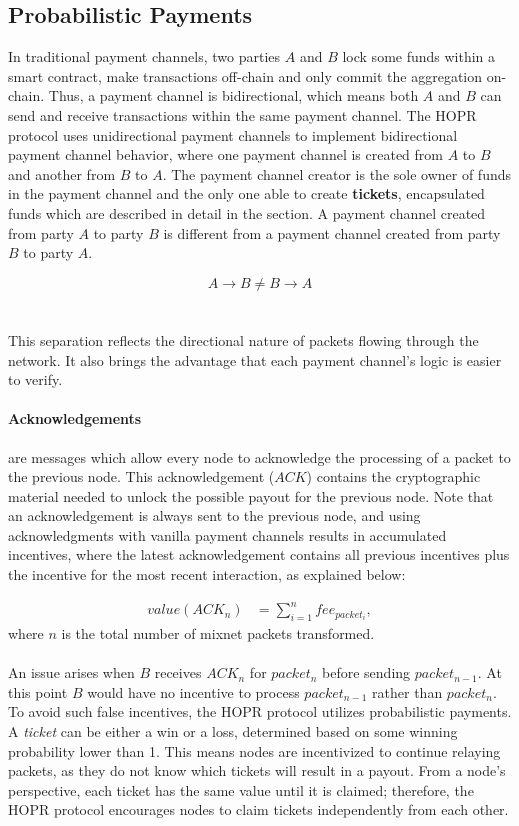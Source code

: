 \subsection{Probabilistic Payments}
\label{sec:probabilisticpayments}

In traditional payment channels, two parties $A$ and $B$ lock some funds within a
smart contract, make transactions off-chain and only commit the aggregation
on-chain. Thus, a payment channel is bidirectional, which means both $A$ and $B$ can
send and receive transactions within the same payment channel. The HOPR protocol uses
unidirectional payment channels to implement bidirectional payment channel behavior, where one
payment channel is created from $A$ to $B$ and another from $B$ to $A$. The payment channel creator is
the sole owner of funds in the payment channel and the only one able to create
\textbf{tickets}, encapsulated funds which are described in detail in the
 section. A payment channel created from party $A$ to party $B$ is
different from a payment channel created from party $B$ to party $A$.

$$A\rightarrow B \neq B\rightarrow A$$
\\~\\This separation reflects the directional nature of packets flowing through the
network. It also brings the advantage that each payment channel's logic is easier to verify.

\paragraph{Acknowledgements} are messages which allow every node to acknowledge
the processing of a packet to the previous node. This acknowledgement ($ACK$) contains
the cryptographic material needed to unlock the possible payout for the previous node.
Note that an acknowledgement is always sent to the previous node, and using
acknowledgments with vanilla payment channels results in accumulated incentives,
where the latest acknowledgement contains all previous incentives plus the
incentive for the most recent interaction, as explained below:

\begin{align}
value (ACK_n) &=\sum_{i=1}^nfee_{packet_i},
\end{align}
where $n$ is the total number of mixnet packets transformed.
\\~\\An issue arises when $B$ receives $ACK_n$ for $packet_n$ before sending
$packet_{n-1}$. At this point $B$ would have no incentive to process
$packet_{n-1}$ rather than $packet_{n}$. To avoid such false incentives, the HOPR
protocol utilizes probabilistic payments. A \textit{ticket} can be either a win
or a loss, determined based on some winning probability lower than 1. This means
nodes are incentivized to continue relaying packets, as they do not know which
tickets will result in a payout. From a node's perspective, each ticket has the same
value until it is claimed; therefore, the HOPR protocol encourages nodes to
claim tickets independently from each other.

